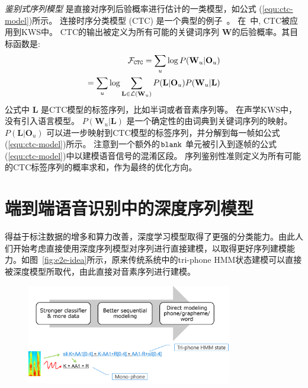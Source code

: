 {\em{鉴别式序列模型}} 是直接对序列后验概率进行估计的一类模型，如公式 (\ref{equ:ctc-model})所示。
连接时序分类模型 (CTC) 是一个典型的例子~\cite{graves2006connectionist,huang2018ctc}。
在~\cite{fernandez2007application}中, CTC被应用到KWS中。
CTC的输出被定义为所有可能的关键词序列 $\mathbf{W}$的后验概率。其目标函数是:
\begin{equation}
\label{equ:ctc-formu}
\begin{split}
\mathcal{F}_{\tt{CTC}}=\sum_{u} \log P(\mathbf{W}_u|\mathbf{O}_u)\\
=\sum_{u} \log \sum_{\mathbf{L}\in\mathcal{L}(\mathbf{W}_u)} P(\mathbf{L}|\mathbf{O}_u)P(\mathbf{W}_u|\mathbf{L})
\end{split}
\end{equation}
公式中 $\mathbf{L}$ 是CTC模型的标签序列，比如半词或者音素序列等。
在声学KWS中，没有引入语言模型。 $P(\mathbf{W}_u|\mathbf{L})$ 是一个确定性的由词典到关键词序列的映射。
$P(\mathbf{L}|\mathbf{O}_u)$ 可以进一步映射到CTC模型的标签序列，并分解到每一帧如公式 (\ref{equ:ctc-model})所示。
注意到一个额外的$\tt blank$ 单元被引入到逐帧的公式 (\ref{equ:ctc-model})中以建模语音信号的混淆区段。
%
序列鉴别性准则定义为所有可能的CTC标签序列的概率求和，作为最终的优化方向。


\section{端到端语音识别中的深度序列模型}
\label{chap:intro2-e2e}

得益于标注数据的增多和算力改善，深度学习模型取得了更强的分类能力。由此人们开始考虑直接使用深度序列模型对序列进行直接建模，以取得更好序列建模能力。如图~\ref{fig:e2e-idea}所示，原来传统系统中的tri-phone HMM状态建模可以直接被深度模型所取代，由此直接对音素序列进行建模。

\begin{figure}[!htp]
  \centering
    \captionstyle{\centering}
    \includegraphics[clip=true, width=0.8\textwidth]{figure/e2e-idea.png}
\end{figure}

